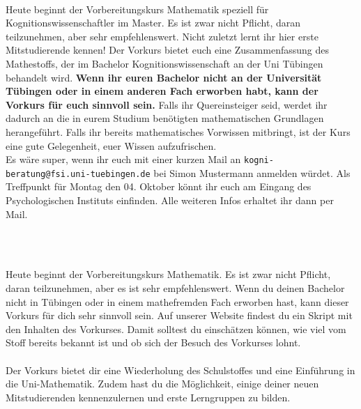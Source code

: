 \begin{description}


\ifkogwiss
    \ifmaster
        \item[Montag, 4. Oktober \YEAR, 08:00 Uhr, Ort wird noch bekannt gegeben]\ \\
        Heute beginnt der Vorbereitungskurs Mathematik speziell für Kognitionswissenschaftler im Master. Es ist zwar nicht Pflicht, daran teilzunehmen, aber sehr empfehlenswert. Nicht zuletzt lernt ihr hier erste Mitstudierende kennen! Der Vorkurs bietet euch eine Zusammenfassung des Mathestoffs, der im Bachelor Kognitionswissenschaft an der Uni Tübingen behandelt wird.
        \textbf{Wenn ihr euren Bachelor nicht an der Universität Tübingen oder in einem anderen Fach erworben habt, kann der Vorkurs für euch sinnvoll sein.} Falls ihr Quereinsteiger seid, werdet ihr dadurch an die in eurem Studium benötigten mathematischen Grundlagen herangeführt. Falls ihr bereits mathematisches Vorwissen mitbringt, ist der Kurs eine gute Gelegenheit, euer Wissen aufzufrischen.\\
         Es wäre super, wenn ihr euch mit einer kurzen Mail an \texttt{kogni-beratung@fsi.uni-tuebingen.de} bei Simon Mustermann anmelden würdet. Als Treffpunkt für Montag den 04. Oktober könnt ihr euch am Eingang des Psychologischen Instituts einfinden. Alle weiteren Infos erhaltet ihr dann per Mail.\\

%
%
    \fi
\fi

\ifml
	\item~ %
\else
    \item[Mathevorkurs -- \mathedatum~\YEAR]~\\
    \ifbachelor
    Heute beginnt der Vorbereitungskurs Mathematik. Es ist zwar nicht Pflicht, daran teilzunehmen, aber es ist sehr empfehlenswert.
    \fi
    \ifmaster
    Wenn du deinen Bachelor nicht in Tübingen oder in einem mathefremden Fach erworben hast, kann dieser Vorkurs für dich sehr sinnvoll sein. Auf unserer Website findest du ein Skript mit den Inhalten des Vorkurses. Damit solltest du einschätzen können, wie viel vom Stoff bereits bekannt ist und ob sich der Besuch des Vorkurses lohnt.\\\\
    \fi
	Der Vorkurs bietet dir eine Wiederholung des Schulstoffes und eine Einführung in die Uni-Mathematik. Zudem hast du die Möglichkeit, einige deiner neuen Mitstudierenden kennenzulernen und erste Lerngruppen zu bilden.
	

\end{description}
